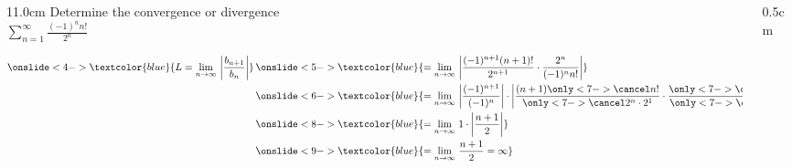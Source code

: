\begin{frame}
\frametitle{}
\scriptsize

\vspace{0.2cm}

\begin{columns}
\begin{column}{11.0cm}
Determine the convergence or divergence\\

$\displaystyle{\sum \limits_{n=1}^{\infty} \frac{(-1)^n n!}{2^n}}$ \qquad {}

\vspace{0.2cm}

\vspace{0.2cm}

\begin{align*}
	\onslide<4->{\textcolor{blue}{L = \lim \limits_{n \to \infty}\, \left|\frac{b_{n+1}}{b_n}\right|}} &\, \onslide<5->{\textcolor{blue}{= \lim \limits_{n \to \infty}\, \left|\frac{(-1)^{n+1} (n+1)!}{2^{n+1}}\cdot \frac{2^n}{(-1)^n n!}\right|}}\\
	&\,\onslide<6->{\textcolor{blue}{= \lim \limits_{n \to \infty}\, \left|\frac{(-1)^{n+1}}{(-1)^{n}}\right| \cdot \left|\frac{(n+1)\only<7->{\cancel}{n!}}{\only<7->{\cancel}{2^n} \cdot 2^{1}}\cdot \frac{\only<7->{\cancel}{2^n}}{\only<7->{\cancel}{n!}}\right|}} \\
	&\,\onslide<8->{\textcolor{blue}{= \lim \limits_{n \to \infty}\, 1 \cdot \left|\frac{n+1}{2}\right|}} \\
	&\,\onslide<9->{\textcolor{blue}{= \lim \limits_{n \to \infty}\, \frac{n+1}{2} = \infty}}
\end{align*}

\vspace{0.2cm}


\vspace{10.5cm}

\end{column}
\begin{column}{0.5cm}
	
\end{column}
\end{columns}
\end{frame}

